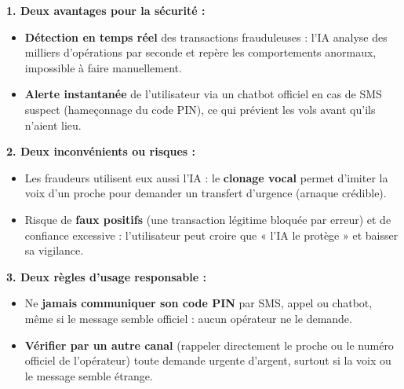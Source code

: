 \documentclass[11pt]{article}
\begin{document}
\begin{corrige}
\textbf{1. Deux avantages pour la sécurité :}
\begin{itemize}
    \item \textbf{Détection en temps réel} des transactions frauduleuses : l'IA analyse des milliers d'opérations par seconde et repère les comportements anormaux, impossible à faire manuellement.
    \item \textbf{Alerte instantanée} de l'utilisateur via un chatbot officiel en cas de SMS suspect (hameçonnage du code PIN), ce qui prévient les vols avant qu'ils n'aient lieu.
\end{itemize}

\textbf{2. Deux inconvénients ou risques :}
\begin{itemize}
    \item Les fraudeurs utilisent eux aussi l'IA : le \textbf{clonage vocal} permet d'imiter la voix d'un proche pour demander un transfert d'urgence (arnaque crédible).
    \item Risque de \textbf{faux positifs} (une transaction légitime bloquée par erreur) et de confiance excessive : l'utilisateur peut croire que « l'IA le protège » et baisser sa vigilance.
\end{itemize}

\textbf{3. Deux règles d'usage responsable :}
\begin{itemize}
    \item Ne \textbf{jamais communiquer son code PIN} par SMS, appel ou chatbot, même si le message semble officiel : aucun opérateur ne le demande.
    \item \textbf{Vérifier par un autre canal} (rappeler directement le proche ou le numéro officiel de l'opérateur) toute demande urgente d'argent, surtout si la voix ou le message semble étrange.
\end{itemize}
\end{corrige}
\end{document}
